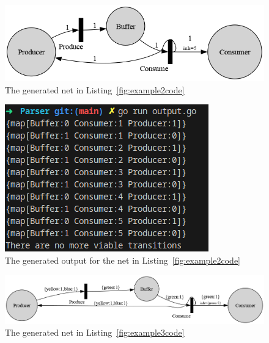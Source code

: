 \documentclass[12pt]{article}
\begin{document}
    \begin{figure}[htbp]
        \centering
        \includegraphics[width=\linewidth]{example2.png}  %
        \caption{The generated net in Listing~\ref{fig:example2code}}
        \label{fig:example2png}
    \end{figure}

    \begin{figure}[htbp]
        \centering
        \includegraphics[width=\linewidth/2]{Output2.png}  %
        \caption{The generated output for the net in Listing~\ref{fig:example2code}}
        \label{fig:example2output}
    \end{figure}

    \begin{figure}[p]  %
        \centering
        
    \end{figure}

    \begin{figure}[htbp]
        \centering
        \includegraphics[width=\linewidth]{example3.png}  %
        \caption{The generated net in Listing~\ref{fig:example3code}}
        \label{fig:example3png}
    \end{figure}
\end{document}

